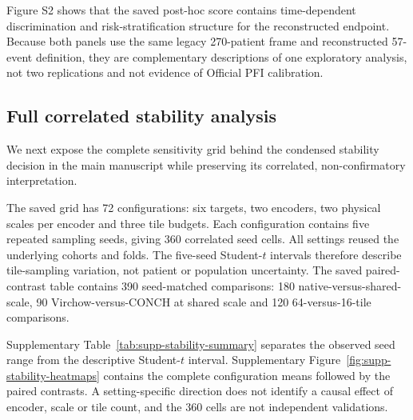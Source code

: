 Figure S2 shows that the saved post-hoc score contains time-dependent discrimination and
risk-stratification structure for the reconstructed endpoint. Because both panels use the
same legacy 270-patient frame and reconstructed 57-event definition, they are complementary
descriptions of one exploratory analysis, not two replications and not evidence of Official
PFI calibration.

\clearpage
\subsection*{Full correlated stability analysis}

We next expose the complete sensitivity grid behind the condensed stability decision in the
main manuscript while preserving its correlated, non-confirmatory interpretation.

The saved grid has 72 configurations: six targets, two encoders, two physical scales per
encoder and three tile budgets. Each configuration contains five repeated sampling seeds,
giving 360 correlated seed cells. All settings reused the underlying cohorts and folds.
The five-seed Student-$t$ intervals therefore describe tile-sampling variation, not patient
or population uncertainty. The saved paired-contrast table contains 390 seed-matched
comparisons: 180 native-versus-shared-scale, 90 Virchow-versus-CONCH at shared scale and
120 64-versus-16-tile comparisons.

Supplementary Table~\ref{tab:supp-stability-summary} separates the observed seed range
from the descriptive Student-$t$ interval. Supplementary
Figure~\ref{fig:supp-stability-heatmaps} contains the complete configuration means followed
by the paired contrasts. A setting-specific direction does not identify a causal effect of
encoder, scale or tile count, and the 360 cells are not independent validations.



